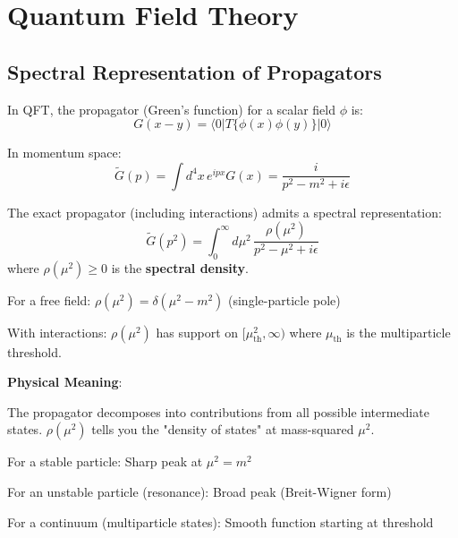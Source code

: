 \section{Quantum Field Theory}

\subsection{Spectral Representation of Propagators}

In QFT, the propagator (Green's function) for a scalar field $\phi$ is:
\begin{equation}
G(x-y) = \langle 0 | T\{\phi(x)\phi(y)\} | 0 \rangle
\end{equation}

In momentum space:
\begin{equation}
\tilde{G}(p) = \int d^4x \, e^{ipx} G(x) = \frac{i}{p^2 - m^2 + i\epsilon}
\end{equation}

\begin{theorem}\label{thm:kallen-lehmann}
The exact propagator (including interactions) admits a spectral representation\cite{kallen1952,lehmann1954,peskin1995}:
\begin{equation}
\boxed{\tilde{G}(p^2) = \int_0^\infty d\mu^2 \, \frac{\rho(\mu^2)}{p^2 - \mu^2 + i\epsilon}}
\end{equation}
where $\rho(\mu^2) \geq 0$ is the \textbf{spectral density}.

For a free field: $\rho(\mu^2) = \delta(\mu^2 - m^2)$ (single-particle pole)

With interactions: $\rho(\mu^2)$ has support on $[\mu_{\text{th}}^2, \infty)$ where $\mu_{\text{th}}$ is the multiparticle threshold.
\end{theorem}

\begin{level1}
\textbf{Physical Meaning}:

The propagator decomposes into contributions from all possible intermediate states. $\rho(\mu^2)$ tells you the "density of states" at mass-squared $\mu^2$.

For a stable particle: Sharp peak at $\mu^2 = m^2$

For an unstable particle (resonance): Broad peak (Breit-Wigner form)

For a continuum (multiparticle states): Smooth function starting at threshold
\end{level1}

